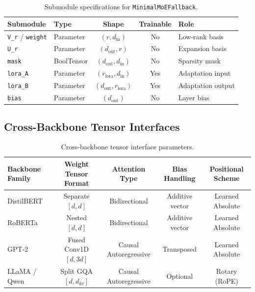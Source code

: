 \begin{table}[H]
\centering
\small
\begin{tabular}{llccp{5cm}}
\toprule
\textbf{Submodule} & \textbf{Type} & \textbf{Shape} & \textbf{Trainable} & \textbf{Role} \\
\midrule
\texttt{V\_r} / \texttt{weight} & Parameter & $(r, d_{\text{in}})$ & No & Low-rank basis \\
\texttt{U\_r} & Parameter & $(d_{\text{out}}, r)$ & No & Expansion basis \\
\texttt{mask} & BoolTensor & $(d_{\text{out}}, d_{\text{in}})$ & No & Sparsity mask \\
\texttt{lora\_A} & Parameter & $(r_{\text{lora}}, d_{\text{in}})$ & Yes & Adaptation input \\
\texttt{lora\_B} & Parameter & $(d_{\text{out}}, r_{\text{lora}})$ & Yes & Adaptation output \\
\texttt{bias} & Parameter & $(d_{\text{out}})$ & No & Layer bias \\
\bottomrule
\end{tabular}
\caption{Submodule specifications for \texttt{MinimalMoEFallback}.}
\label{tab:submodules_sambamoe}
\end{table}

\subsection{Cross-Backbone Tensor Interfaces}
\begin{table}[H]
\centering
\small
\begin{tabular}{lcccc}
\toprule
\textbf{Backbone Family} & \textbf{Weight Tensor Format} & \textbf{Attention Type} & \textbf{Bias Handling} & \textbf{Positional Scheme} \\
\midrule
DistilBERT & Separate $[d, d]$ & Bidirectional & Additive vector & Learned Absolute \\
RoBERTa & Nested $[d, d]$ & Bidirectional & Additive vector & Learned Absolute \\
GPT-2 & Fused Conv1D $[d, 3d]$ & Causal Autoregressive & Transposed & Learned Absolute \\
LLaMA / Qwen & Split GQA $[d, d_{kv}]$ & Causal Autoregressive & Optional & Rotary (RoPE) \\
\bottomrule
\end{tabular}
\caption{Cross-backbone tensor interface parameters.}
\label{tab:backbone_interfaces}
\end{table}

